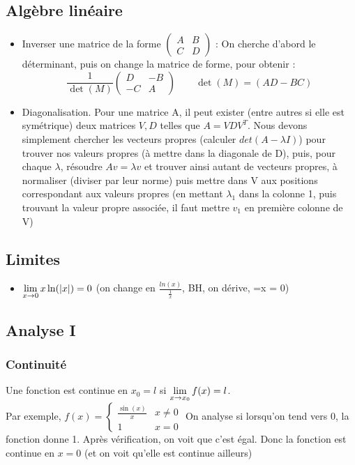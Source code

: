 \documentclass[12pt,a4paper]{article}
\renewcommand{\)}{\right)}
\renewcommand{\(}{\left(}
\begin{document}
\subsection{Algèbre linéaire}
\begin{itemize}
	\item 	Inverser une matrice de la forme 
			$\begin{pmatrix}
				A & B\\
				C & D
			\end{pmatrix}$ : On cherche d'abord le déterminant, puis on change la matrice de forme, pour obtenir :
			\begin{equation*}
				\frac{1}{\det(M)} \begin{pmatrix}
				D & -B\\
				-C & A
				\end{pmatrix} \qquad \det(M) = (AD-BC)
			\end{equation*}
	\item 	Diagonalisation. Pour une matrice A, il peut exister (entre autres si elle est symétrique) deux matrices $V,D$ telles que $A = VDV^T$. Nous devons simplement chercher les vecteurs propres (calculer $det(A-\lambda I)$) pour trouver nos valeurs propres (à mettre dans la diagonale de D), puis, pour chaque $\lambda$, résoudre $Av = \lambda v$ et trouver ainsi autant de vecteurs propres, à normaliser (diviser par leur norme) puis mettre dans V aux positions correspondant aux valeurs propres (en mettant $\lambda_1$ dans la colonne 1, puis trouvant la valeur propre associée, il faut mettre $v_1$ en première colonne de V)
\end{itemize}

\subsection{Limites}
\begin{itemize}
	\item $\lim\limits_{x\to 0} x\ln(|x|) = 0$ (on change en $\frac{ln(x)}{\frac{1}{x}}$, BH, on dérive, =x = 0)
\end{itemize}
\subsection{Analyse I}
\subsubsection{Continuité}
Une fonction est continue en $x_0 = l$ si $\lim\limits_{x\to x_0}{f(x)} = l$.\\
Par exemple, $f(x) = 
\left\{\begin{array}{ll}
	\frac{\sin(x)}{x} & x\neq 0\\
	1 & x = 0
\end{array}\right.$ On analyse si lorsqu'on tend vers 0, la fonction donne 1. Après vérification, on voit que c'est égal. Donc la fonction est continue en $x=0$ (et on voit qu'elle est continue ailleurs)
\end{document}
